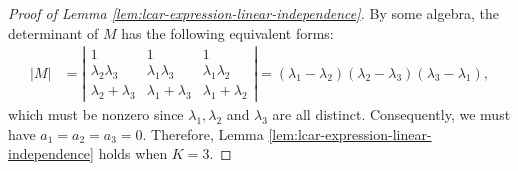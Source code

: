 \documentclass[11pt]{article}
\theoremstyle{definition}
\theoremstyle{remark}
\begin{document}
\begin{proof}[Proof of Lemma \ref{lem:lcar-expression-linear-independence}]
By some algebra, the determinant of $M$ has the following equivalent forms:
\begin{align*}
|M|&=\left| \begin{matrix} 1 & 1 & 1 \\
\lambda_2\lambda_3 & \lambda_1\lambda_3 & \lambda_1\lambda_2\\
\lambda_2+\lambda_3 & \lambda_1+\lambda_3 & \lambda_1+\lambda_2 \end{matrix}\right|
= (\lambda_1-\lambda_2)(\lambda_2-\lambda_3)(\lambda_3-\lambda_1),
\end{align*} 
which must be nonzero since $\lambda_1, \lambda_2$ and $\lambda_3$ are all distinct. 
Consequently, we must have $a_1=a_2=a_3=0$. 
Therefore, Lemma \ref{lem:lcar-expression-linear-independence} holds when $K=3$.
\end{proof}
\end{document}

